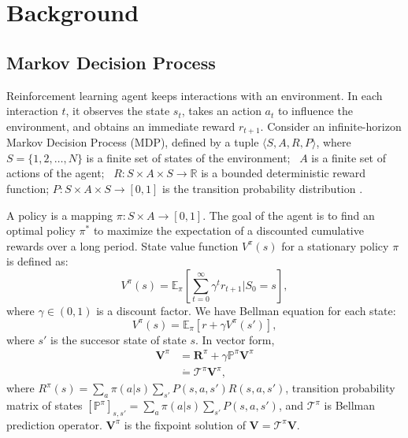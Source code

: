 \section{Background}
\label{preliminaries}
\subsection{Markov Decision Process}
Reinforcement learning agent keeps interactions with an environment. 
In each interaction $t$, it observes the state $s_t$,
 takes an action $a_t$ to influence the environment, and obtains
 an immediate reward $r_{t+1}$.
 Consider an infinite-horizon Markov Decision Process (MDP), defined by a tuple $\langle S,A,R,P
 \rangle$, where $S=\{1,2,\ldots,N\}$ is a finite set of states of the environment;  $A$
 is a finite set of actions of the agent; 
 $R:S\times A \times S \rightarrow \mathbb{R}$ is a bounded deterministic reward
 function; $P:S\times A\times S \rightarrow [0,1]$ is the transition
 probability distribution \cite{Sutton2018book}.  
 
 A policy is a mapping $\pi:S\times A \rightarrow [0,1]$. The goal of the
 agent is to find an optimal policy $\pi^*$ to maximize the expectation of a
 discounted cumulative rewards over a long period. 
 State value function $V^{\pi}(s)$ for a stationary policy $\pi$ is 
 defined as:  
 \begin{equation}
 V^{\pi}(s)=\mathbb{E}_{\pi}[\sum_{t=0}^{\infty} \gamma^t r_{t+1}|S_0=s],
 \label{valuefunction}
 \end{equation}
 where $\gamma\in (0,1)$
 is a discount factor.
 We have Bellman equation for each state:
 \begin{equation}
 V^{\pi}(s)=\mathbb{E}_{\pi}[ r+\gamma  V^{\pi}(s')],
 \end{equation}
 where $s'$ is the succesor state of state $s$.
 In vector form,
  \begin{equation}
  \begin{split}
 \bm{V}^{\pi}&=\bm{R}^{\pi}+\gamma \bm{\mathbb{P}}^{\pi} \bm{V}^{\pi}\\
 &\dot{=} \bm{\mathcal{T}}^{\pi}\bm{V}^{\pi},
 \end{split}
 \end{equation}
 where $R^{\pi}(s)=\sum_{a}\pi(a|s)\sum_{s'}P(s,a,s')R(s,a,s')$,
 transition probability matrix of states 
 $[\mathbb{P}^{\pi}]_{s,s'}=\sum_{a}\pi(a|s)\sum_{s'}P(s,a,s')$,
 and $\bm{\mathcal{T}}^{\pi}$ is Bellman prediction operator.
 $\bm{V}^{\pi}$ is the fixpoint solution of $\bm{V}=\bm{\mathcal{T}}^{\pi}\bm{V}$.
 
